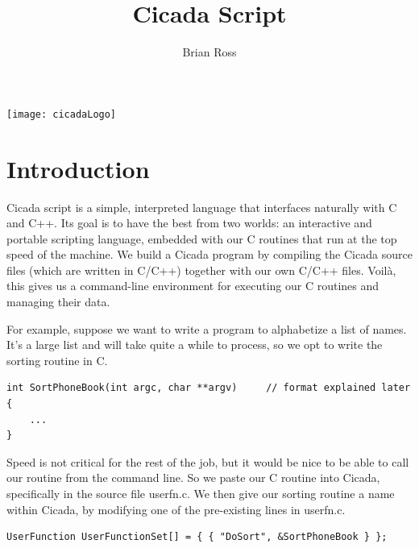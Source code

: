 \documentclass{article}
\title{Cicada Script}
\author{Brian Ross}
\newenvironment{code}{
       \begin{list}{}{
               \setlength{\leftmargin}{.4in}
               \setlength{\rightmargin}{0in}
               \setlength{\topsep}{.2in}
       }
       \small
       \item[] }
       { \end{list}   }
\begin{document}
\maketitle
\vspace{.5in}
\begin{centering}
\texttt{[image: cicadaLogo]}\\
\end{centering}
\vspace{.5in}
\tableofcontents
\vspace{1.5in}
\newpage





\section{Introduction}

Cicada script is a simple, interpreted language that interfaces naturally with C and C++.  Its goal is to have the best from two worlds:  an interactive and portable scripting language, embedded with our C routines that run at the top speed of the machine.  We build a Cicada program by compiling the Cicada source files (which are written in C/C++) together with our own C/C++ files.  Voil\`a, this gives us a command-line environment for executing our C routines and managing their data.

For example, suppose we want to write a program to alphabetize a list of names.  It's a large list and will take quite a while to process, so we opt to write the sorting routine in C.

\begin{code} \begin{verbatim}
int SortPhoneBook(int argc, char **argv)     // format explained later
{
    ...
}
\end{verbatim} \end{code}
 
\noindent Speed is not critical for the rest of the job, but it would be nice to be able to call our routine from the command line.  So we paste our C routine into Cicada, specifically in the source file userfn.c.  We then give our sorting routine a name within Cicada, by modifying one of the pre-existing lines in userfn.c.

\begin{code} \begin{verbatim}
UserFunction UserFunctionSet[] = { { "DoSort", &SortPhoneBook } };
\end{verbatim} \end{code}
\end{document}
